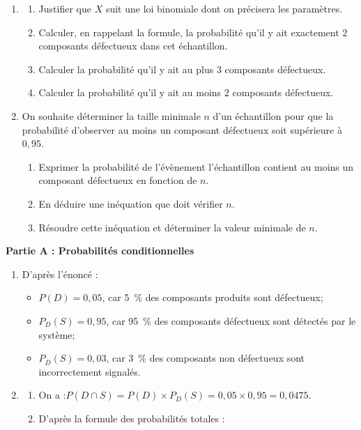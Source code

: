 \documentclass[TC, exos, e,p]{phBook}
\begin{document}
\begin{exercice}
\begin{enonce}
\begin{enumerate}[resume]
\item
	\begin{enumerate}
		\item Justifier que $X$ suit une loi binomiale dont on précisera les paramètres.
		\item Calculer, en rappelant la formule, la probabilité qu'il y ait exactement $2$ composants défectueux dans cet échantillon.
		\item Calculer la probabilité qu'il y ait au plus $3$ composants défectueux.
		\item Calculer la probabilité qu'il y ait au moins $2$ composants défectueux.
	\end{enumerate}

\item On souhaite déterminer la taille minimale $n$ d'un échantillon pour que la probabilité d'observer au moins un composant défectueux soit supérieure à $0,95$.
	\begin{enumerate}
		\item Exprimer la probabilité de l'évènement \og l'échantillon contient au moins un composant défectueux\fg{} en fonction de $n$.
		\item En déduire une inéquation que doit vérifier $n$.
		\item Résoudre cette inéquation%
		et déterminer la valeur minimale de $n$.
	\end{enumerate}
\end{enumerate}

    \end{enonce}

    \begin{correction}
        \textbf{Partie A : Probabilités conditionnelles}

\begin{enumerate}
\item D'après l'énoncé :
\begin{itemize}
\item $P(D) = 0,05$, car 5~\% des composants produits sont défectueux;
\item $P_D(S) = 0,95$, car 95~\% des composants défectueux sont détectés par le système;
\item $P_{\overline{D}}(S) = 0,03$, car 3~\% des composants non défectueux sont incorrectement signalés.
\end{itemize}

\item 
	\begin{enumerate}
		\item On a :\quad $P(D \cap S) = P(D) \times P_D(S) = 0,05 \times 0,95 = 0,0475$.
		\item D'après la formule des probabilités totales :


\end{enumerate}
\end{enumerate}
\end{correction}
\end{exercice}
\end{document}
